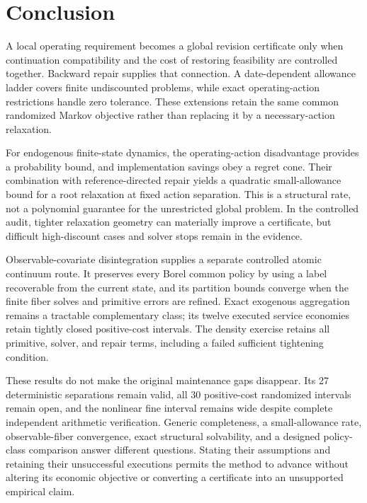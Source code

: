 

\section{Conclusion}\label{sec:conclusion}
A local operating requirement becomes a global revision certificate only when continuation compatibility and the cost of restoring feasibility are controlled together. Backward repair supplies that connection. A date-dependent allowance ladder covers finite undiscounted problems, while exact operating-action restrictions handle zero tolerance. These extensions retain the same common randomized Markov objective rather than replacing it by a necessary-action relaxation.

For endogenous finite-state dynamics, the operating-action disadvantage provides a probability bound, and implementation savings obey a regret cone. Their combination with reference-directed repair yields a quadratic small-allowance bound for a root relaxation at fixed action separation. This is a structural rate, not a polynomial guarantee for the unrestricted global problem. In the controlled audit, tighter relaxation geometry can materially improve a certificate, but difficult high-discount cases and solver stops remain in the evidence.

Observable-covariate disintegration supplies a separate controlled atomic continuum route. It preserves every Borel common policy by using a label recoverable from the current state, and its partition bounds converge when the finite fiber solves and primitive errors are refined. Exact exogenous aggregation remains a tractable complementary class; its twelve executed service economies retain tightly closed positive-cost intervals. The density exercise retains all primitive, solver, and repair terms, including a failed sufficient tightening condition.

These results do not make the original maintenance gaps disappear. Its 27 deterministic separations remain valid, all 30 positive-cost randomized intervals remain open, and the nonlinear fine interval remains wide despite complete independent arithmetic verification. Generic completeness, a small-allowance rate, observable-fiber convergence, exact structural solvability, and a designed policy-class comparison answer different questions. Stating their assumptions and retaining their unsuccessful executions permits the method to advance without altering its economic objective or converting a certificate into an unsupported empirical claim.



